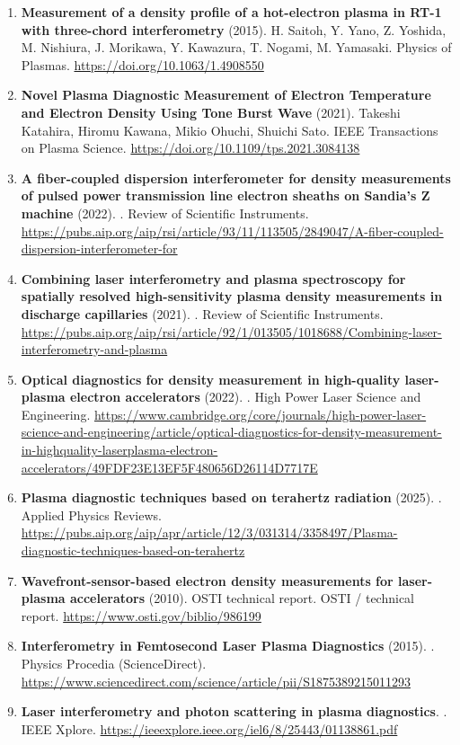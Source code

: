 \documentclass[11pt,a4paper]{article}
\begin{document}
\begin{enumerate}[leftmargin=1.4em]
\item \textbf{Measurement of a density profile of a hot-electron plasma in RT-1 with three-chord interferometry} (2015). H. Saitoh, Y. Yano, Z. Yoshida, M. Nishiura, J. Morikawa, Y. Kawazura, T. Nogami, M. Yamasaki. Physics of Plasmas. \url{https://doi.org/10.1063/1.4908550}
\item \textbf{Novel Plasma Diagnostic Measurement of Electron Temperature and Electron Density Using Tone Burst Wave} (2021). Takeshi Katahira, Hiromu Kawana, Mikio Ohuchi, Shuichi Sato. IEEE Transactions on Plasma Science. \url{https://doi.org/10.1109/tps.2021.3084138}
\item \textbf{A fiber-coupled dispersion interferometer for density measurements of pulsed power transmission line electron sheaths on Sandia's Z machine} (2022). . Review of Scientific Instruments. \url{https://pubs.aip.org/aip/rsi/article/93/11/113505/2849047/A-fiber-coupled-dispersion-interferometer-for}
\item \textbf{Combining laser interferometry and plasma spectroscopy for spatially resolved high-sensitivity plasma density measurements in discharge capillaries} (2021). . Review of Scientific Instruments. \url{https://pubs.aip.org/aip/rsi/article/92/1/013505/1018688/Combining-laser-interferometry-and-plasma}
\item \textbf{Optical diagnostics for density measurement in high-quality laser-plasma electron accelerators} (2022). . High Power Laser Science and Engineering. \url{https://www.cambridge.org/core/journals/high-power-laser-science-and-engineering/article/optical-diagnostics-for-density-measurement-in-highquality-laserplasma-electron-accelerators/49FDF23E13EF5F480656D26114D7717E}
\item \textbf{Plasma diagnostic techniques based on terahertz radiation} (2025). . Applied Physics Reviews. \url{https://pubs.aip.org/aip/apr/article/12/3/031314/3358497/Plasma-diagnostic-techniques-based-on-terahertz}
\item \textbf{Wavefront-sensor-based electron density measurements for laser-plasma accelerators} (2010). OSTI technical report. OSTI / technical report. \url{https://www.osti.gov/biblio/986199}
\item \textbf{Interferometry in Femtosecond Laser Plasma Diagnostics} (2015). . Physics Procedia (ScienceDirect). \url{https://www.sciencedirect.com/science/article/pii/S1875389215011293}
\item \textbf{Laser interferometry and photon scattering in plasma diagnostics}. . IEEE Xplore. \url{https://ieeexplore.ieee.org/iel6/8/25443/01138861.pdf}
\end{enumerate}
\end{document}
